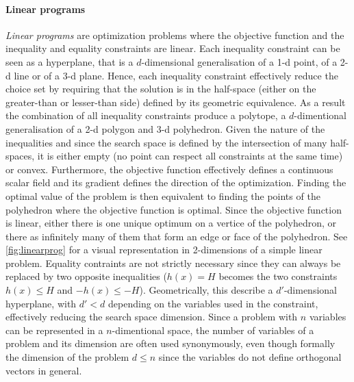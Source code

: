 	\paragraph{Linear programs}
	\emph{Linear programs} are optimization problems where the objective function and the inequality and equality constraints are linear.
	Each inequality constraint can be seen as a hyperplane, that is a $d$-dimensional generalisation of a 1-d point, of a 2-d line or of a 3-d plane.
	Hence, each inequality constraint effectively reduce the choice set by requiring that the solution is in the half-space (either on the greater-than or lesser-than side) defined by its geometric equivalence.
	As a result the combination of all inequality constraints produce a polytope, a $d$-dimentional generalisation of a 2-d polygon and 3-d polyhedron.
	Given the nature of the inequalities and since the search space is defined by the intersection of many half-spaces, it is either empty (no point can respect all constraints at the same time) or convex.
	Furthermore, the objective function effectively defines a continuous scalar field and its gradient defines the direction of the optimization.
	Finding the optimal value of the problem is then equivalent to finding the points of the polyhedron where the objective function is optimal.
	Since the objective function is linear, either there is one unique optimum on a vertice of the polyhedron, or there as infinitely many of them that form an edge or face of the polyhedron.
	See \cref{fig:linearprog} for a visual representation in 2-dimensions of a simple linear problem.
	Equality contraints are not strictly necessary since they can always be replaced by two opposite inequalities ($h(x) = H$ becomes the two constraints $h(x) \leq H$ and $-h(x) \leq -H$).
	Geometrically, this describe a $d'$-dimensional hyperplane, with $d' < d$ depending on the variables used in the constraint, effectively reducing the search space dimension.
	Since a problem with $n$ variables can be represented in a $n$-dimentional space, the number of variables of a problem and its dimension are often used synonymously, even though formally the dimension of the problem $d \leq n$ since the variables do not define orthogonal vectors in general.
	
